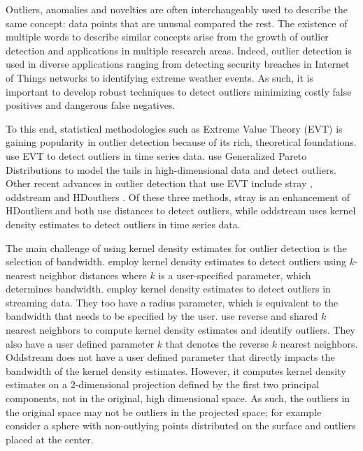 \documentclass[letter,12pt]{article}
\begin{document}
Outliers, anomalies and novelties are often interchangeably used to describe the same concept: data points that are unusual compared the rest. The existence of multiple words to describe similar concepts arise from the growth of outlier detection and applications in multiple research areas.  Indeed, outlier detection is used in diverse applications ranging from detecting security breaches in Internet of Things networks to identifying extreme weather events. As such, it is important to develop robust techniques to detect outliers minimizing costly false positives and dangerous false negatives. 

To this end, statistical methodologies such as Extreme Value Theory (EVT) is gaining popularity in outlier detection because of its rich, theoretical foundations. \cite{Burridge2006} use EVT to detect outliers in time series data. \cite{Clifton2014} use Generalized Pareto Distributions to model the tails in high-dimensional data and detect outliers. Other recent advances in outlier detection that use EVT include   stray \citep{pridiltal}, oddstream \citep{talagala2019anomaly} and HDoutliers \citep{wilkinson2017visualizing}. Of these three methods, stray is an enhancement of HDoutliers and both  use distances to detect outliers, while oddstream uses kernel density estimates to detect outliers in time series data.

The main challenge of using kernel density estimates for outlier detection is the selection of bandwidth. \cite{Schubert2014} employ kernel density estimates to detect outliers using $k$-nearest neighbor distances where $k$ is a user-specified parameter, which determines bandwidth. \cite{Qin2019} employ kernel density estimates to detect outliers in streaming data. They too have a radius parameter, which is equivalent to the bandwidth that needs to be specified by the user. \cite{Tang2017} use reverse and shared $k$ nearest neighbors to compute kernel density estimates and identify outliers. They also have a user defined parameter $k$ that denotes the reverse $k$ nearest neighbors.  Oddstream \citep{talagala2019anomaly} does not have a user defined parameter that directly impacts the bandwidth of the kernel density estimates. However, it computes kernel density estimates on a  2-dimensional projection defined by the first two principal components, not in the original, high dimensional space. As such, the outliers in the original space may not be outliers in the projected space; for example consider a sphere with non-outlying points distributed on the surface and outliers placed at the center. 
\end{document}

